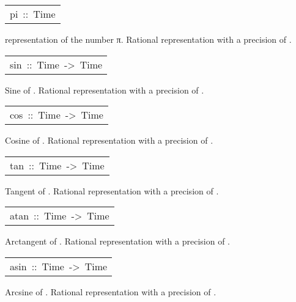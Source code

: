 \begin{haddockdesc}
\item[\begin{tabular}{@{}l}
pi\ ::\ Time
\end{tabular}]\haddockbegindoc
{} representation of the number π. Rational
 representation with a precision of .\par

\end{haddockdesc}
\begin{haddockdesc}
\item[\begin{tabular}{@{}l}
sin\ ::\ Time\ ->\ Time
\end{tabular}]\haddockbegindoc
Sine of . Rational representation with a precision of
 .\par

\end{haddockdesc}
\begin{haddockdesc}
\item[\begin{tabular}{@{}l}
cos\ ::\ Time\ ->\ Time
\end{tabular}]\haddockbegindoc
Cosine of . Rational representation with a precision of
 .\par

\end{haddockdesc}
\begin{haddockdesc}
\item[\begin{tabular}{@{}l}
tan\ ::\ Time\ ->\ Time
\end{tabular}]\haddockbegindoc
Tangent of . Rational representation with a precision of
 .\par

\end{haddockdesc}
\begin{haddockdesc}
\item[\begin{tabular}{@{}l}
atan\ ::\ Time\ ->\ Time
\end{tabular}]\haddockbegindoc
Arctangent of . Rational representation with a precision
 of .\par

\end{haddockdesc}
\begin{haddockdesc}
\item[\begin{tabular}{@{}l}
asin\ ::\ Time\ ->\ Time
\end{tabular}]\haddockbegindoc
Arcsine of . Rational representation with a precision of
 .\par

\end{haddockdesc}
